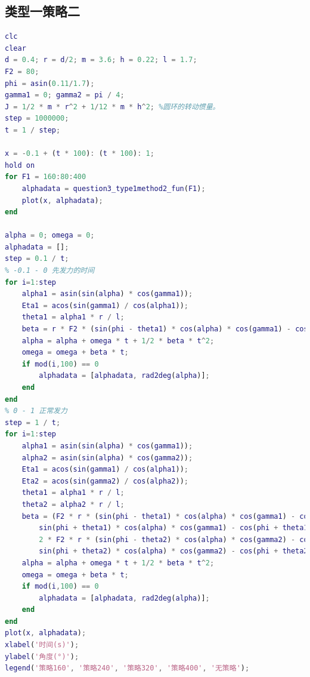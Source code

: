 \documentclass{cumcm}
\begin{document}
\subsection{类型一策略二}
\begin{lstlisting}[language=matlab]
clc
clear
d = 0.4; r = d/2; m = 3.6; h = 0.22; l = 1.7;
F2 = 80;
phi = asin(0.11/1.7);
gamma1 = 0; gamma2 = pi / 4;
J = 1/2 * m * r^2 + 1/12 * m * h^2; %圆环的转动惯量。
step = 1000000;
t = 1 / step;

x = -0.1 + (t * 100): (t * 100): 1;
hold on
for F1 = 160:80:400
    alphadata = question3_type1method2_fun(F1);
    plot(x, alphadata);
end

alpha = 0; omega = 0;
alphadata = [];
step = 0.1 / t;
% -0.1 - 0 先发力的时间
for i=1:step
    alpha1 = asin(sin(alpha) * cos(gamma1));
    Eta1 = acos(sin(gamma1) / cos(alpha1));
    theta1 = alpha1 * r / l;
    beta = r * F2 * (sin(phi - theta1) * cos(alpha) * cos(gamma1) - cos(phi - theta1) * sin(alpha1) * sin(Eta1)) / J;
    alpha = alpha + omega * t + 1/2 * beta * t^2;
    omega = omega + beta * t;
    if mod(i,100) == 0
        alphadata = [alphadata, rad2deg(alpha)];
    end
end
% 0 - 1 正常发力
step = 1 / t;
for i=1:step
    alpha1 = asin(sin(alpha) * cos(gamma1));
    alpha2 = asin(sin(alpha) * cos(gamma2));
    Eta1 = acos(sin(gamma1) / cos(alpha1));
    Eta2 = acos(sin(gamma2) / cos(alpha2));
    theta1 = alpha1 * r / l;
    theta2 = alpha2 * r / l;
    beta = (F2 * r * (sin(phi - theta1) * cos(alpha) * cos(gamma1) - cos(phi - theta1) * sin(alpha1) * sin(Eta1) - ...
        sin(phi + theta1) * cos(alpha) * cos(gamma1) - cos(phi + theta1) * sin(alpha1) * sin(Eta1)) + ...
        2 * F2 * r * (sin(phi - theta2) * cos(alpha) * cos(gamma2) - cos(phi - theta2) * sin(alpha2) * sin(Eta2) - ...
        sin(phi + theta2) * cos(alpha) * cos(gamma2) - cos(phi + theta2) * sin(alpha2) * sin(Eta2))) / J;
    alpha = alpha + omega * t + 1/2 * beta * t^2;
    omega = omega + beta * t;
    if mod(i,100) == 0
        alphadata = [alphadata, rad2deg(alpha)];
    end
end
plot(x, alphadata);
xlabel('时间(s)');
ylabel('角度(°)');
legend('策略160', '策略240', '策略320', '策略400', '无策略');
\end{lstlisting}
\end{document}
